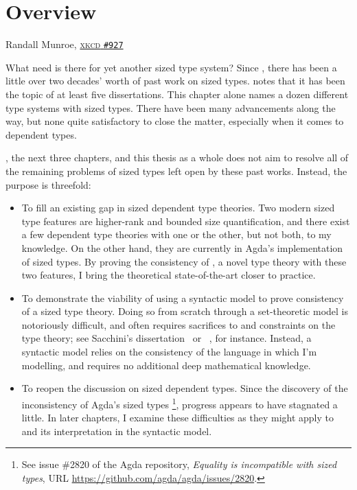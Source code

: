 \chapter{Overview} \label{ch:overview}

{Randall Munroe, \href{https://xkcd.com/927/}{\textsc{xkcd} \texttt{\#927}}}

What need is there for yet another sized type system?
Since \citet{hughes}, there has been a little over two decades' worth of past work on sized types.
\citet{flationary} notes that it has been the topic of at least five dissertations.
This chapter alone names a dozen different type systems with sized types.
There have been many advancements along the way,
but none quite satisfactory to close the matter,
especially when it comes to dependent types.

\lang, the next three chapters, and this thesis as a whole does not aim to resolve
all of the remaining problems of sized types left open by these past works.
Instead, the purpose is threefold:

\begin{itemize}
  \item To fill an existing gap in sized dependent type theories.
    Two modern sized type features are higher-rank and bounded size quantification,
    and there exist a few dependent type theories with one or the other,
    but not both, to my knowledge.
    On the other hand, they are currently in Agda's implementation of sized types.
    By proving the consistency of \lang, a novel type theory with these two features,
    I bring the theoretical state-of-the-art closer to practice.
  \item To demonstrate the viability of using a syntactic model to prove consistency
    of a sized type theory.
    Doing so from scratch through a set-theoretic model is notoriously difficult,
    and often requires sacrifices to and constraints on the type theory;
    see Sacchini's dissertation~\citep{CIC-hat-minus} or \CIChatstar~\citep{CIC-hat-star},
    for instance.
    Instead, a syntactic model relies on the consistency of the language in which I'm modelling,
    and requires no additional deep mathematical knowledge.
  \clearpage %
  \item To reopen the discussion on sized dependent types.
    Since the discovery of the inconsistency of Agda's sized types%
    \footnote{\label{foot:agda-inconsistent} See issue \#2820 of the Agda repository,
    \textit{Equality is incompatible with sized types},
    URL \url{https://github.com/agda/agda/issues/2820}.},
    progress appears to have stagnated a little.
    In later chapters, I examine these difficulties as they might apply to \lang
    and its interpretation in the syntactic model.
\end{itemize}

